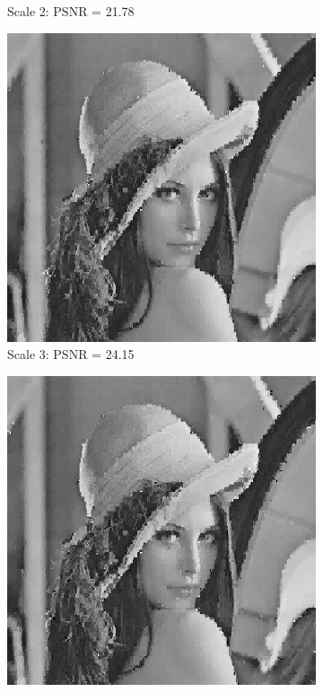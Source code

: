 \begin{figure}
\begin{subfigure}{0.4\textwidth}
    \caption{Scale 2: PSNR = 21.78}
  \end{subfigure}
  \begin{subfigure}{0.4\textwidth}
    \includegraphics[width=\textwidth]{Chapter5/Images/lenna_haar3.png}
    \caption{Scale 3: PSNR = 24.15}
  \end{subfigure}
  \begin{subfigure}{0.4\textwidth}
    \includegraphics[width=\textwidth]{Chapter5/Images/lenna_haar4.png}

\end{subfigure}
\end{figure}
